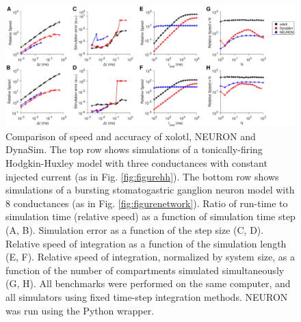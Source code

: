 \documentclass{frontiersSCNS} %
\begin{document}
\begin{figure}
	\centering
	\includegraphics[width=1.0\linewidth]{gfx/figure_benchmark}
	\caption{Comparison of speed and accuracy of xolotl, NEURON and DynaSim. The top row shows simulations of a tonically-firing Hodgkin-Huxley model with three conductances with constant injected current (as in Fig. \ref{fig:figurehh}). The bottom row shows simulations of  a bursting stomatogastric ganglion neuron model with 8 conductances (as in Fig. \ref{fig:figurenetwork}). Ratio of run-time to simulation time (relative speed) as a function of simulation time step (A, B). Simulation error as a function of the step size (C, D).  Relative speed of integration as a function of the simulation length (E, F). Relative speed of integration, normalized by system size, as a function of the number of compartments simulated simultaneously (G, H). All benchmarks were performed on the same computer, and all simulators using fixed time-step integration methods. NEURON was run using the Python wrapper. }
	\label{fig:figurebenchmark}
\end{figure}
\end{document}

